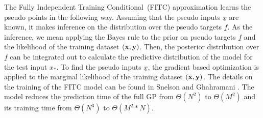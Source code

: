 \begin{figure}[!ht]
    \centering
    \begin{floatrow}
    \end{floatrow}
\end{figure}
 
\noindent The Fully Independent Training Conditional\ (FITC) approximation \cite{snelson2006sparse} learns the pseudo points in the following way. Assuming that the pseudo inputs $\underline{x}$ are known, it makes inference on the distribution over the pseudo targets $\underline{f}$. As the inference, we mean applying the Bayes rule to the prior on pseudo targets $\underline{f}$ and the likelihood of the training dataset $({\bf x}, {\bf y})$. Then, the posterior distribution over $\underline{f}$ can be integrated out to calculate the predictive distribution of the model for the test input $x_{*}$. To find the pseudo inputs $\underline{x}$, the gradient based optimization is applied to the marginal likelihood of the training dataset $({\bf x}, {\bf y})$. The details on the training of the FITC model can be found in Snelson and Ghahramani \cite{snelson2006sparse}. The model reduces the prediction time of the full GP from $\Theta(N^2)$ to $\Theta(M^2)$ and its training time from $\Theta(N^3)$ to $\Theta(M^2*N)$.


